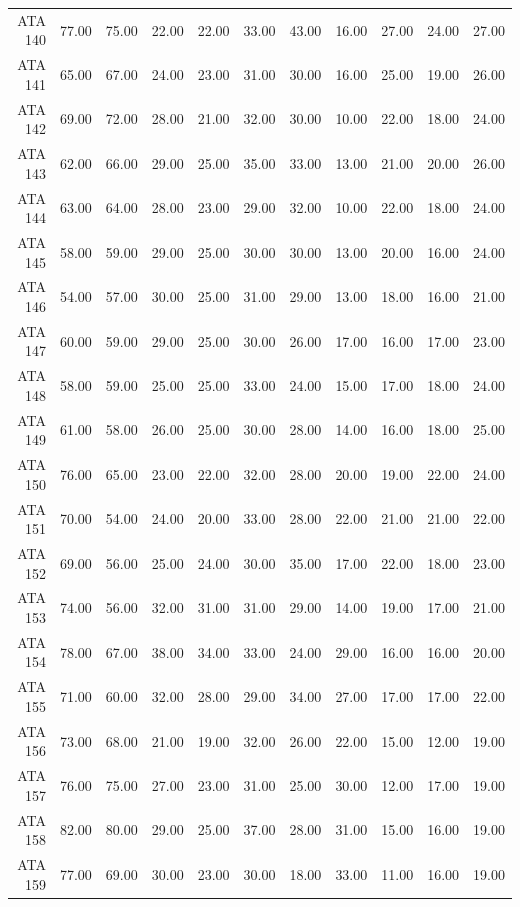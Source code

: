 \begin{landscape}
\begin{longtable}{rrrrrrrrrrr}
  ATA 140 & 77.00 & 75.00 & 22.00 & 22.00 & 33.00 & 43.00 & 16.00 & 27.00 & 24.00 & 27.00 \\ 
  ATA 141 & 65.00 & 67.00 & 24.00 & 23.00 & 31.00 & 30.00 & 16.00 & 25.00 & 19.00 & 26.00 \\ 
  ATA 142 & 69.00 & 72.00 & 28.00 & 21.00 & 32.00 & 30.00 & 10.00 & 22.00 & 18.00 & 24.00 \\ 
  ATA 143 & 62.00 & 66.00 & 29.00 & 25.00 & 35.00 & 33.00 & 13.00 & 21.00 & 20.00 & 26.00 \\ 
  ATA 144 & 63.00 & 64.00 & 28.00 & 23.00 & 29.00 & 32.00 & 10.00 & 22.00 & 18.00 & 24.00 \\ 
  ATA 145 & 58.00 & 59.00 & 29.00 & 25.00 & 30.00 & 30.00 & 13.00 & 20.00 & 16.00 & 24.00 \\ 
  ATA 146 & 54.00 & 57.00 & 30.00 & 25.00 & 31.00 & 29.00 & 13.00 & 18.00 & 16.00 & 21.00 \\ 
  ATA 147 & 60.00 & 59.00 & 29.00 & 25.00 & 30.00 & 26.00 & 17.00 & 16.00 & 17.00 & 23.00 \\ 
  ATA 148 & 58.00 & 59.00 & 25.00 & 25.00 & 33.00 & 24.00 & 15.00 & 17.00 & 18.00 & 24.00 \\ 
  ATA 149 & 61.00 & 58.00 & 26.00 & 25.00 & 30.00 & 28.00 & 14.00 & 16.00 & 18.00 & 25.00 \\ 
  ATA 150 & 76.00 & 65.00 & 23.00 & 22.00 & 32.00 & 28.00 & 20.00 & 19.00 & 22.00 & 24.00 \\ 
  ATA 151 & 70.00 & 54.00 & 24.00 & 20.00 & 33.00 & 28.00 & 22.00 & 21.00 & 21.00 & 22.00 \\ 
  ATA 152 & 69.00 & 56.00 & 25.00 & 24.00 & 30.00 & 35.00 & 17.00 & 22.00 & 18.00 & 23.00 \\ 
  ATA 153 & 74.00 & 56.00 & 32.00 & 31.00 & 31.00 & 29.00 & 14.00 & 19.00 & 17.00 & 21.00 \\ 
  ATA 154 & 78.00 & 67.00 & 38.00 & 34.00 & 33.00 & 24.00 & 29.00 & 16.00 & 16.00 & 20.00 \\ 
  ATA 155 & 71.00 & 60.00 & 32.00 & 28.00 & 29.00 & 34.00 & 27.00 & 17.00 & 17.00 & 22.00 \\ 
  ATA 156 & 73.00 & 68.00 & 21.00 & 19.00 & 32.00 & 26.00 & 22.00 & 15.00 & 12.00 & 19.00 \\ 
  ATA 157 & 76.00 & 75.00 & 27.00 & 23.00 & 31.00 & 25.00 & 30.00 & 12.00 & 17.00 & 19.00 \\ 
  ATA 158 & 82.00 & 80.00 & 29.00 & 25.00 & 37.00 & 28.00 & 31.00 & 15.00 & 16.00 & 19.00 \\ 
  ATA 159 & 77.00 & 69.00 & 30.00 & 23.00 & 30.00 & 18.00 & 33.00 & 11.00 & 16.00 & 19.00 \\ 

\end{longtable}
\end{landscape}
